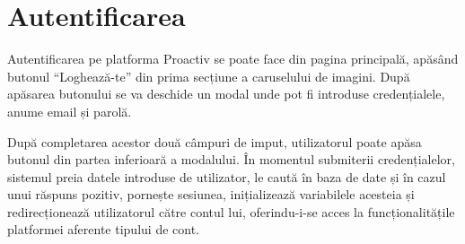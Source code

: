 \documentclass[12pt,a4paper]{report}
\begin{document}
\section{Autentificarea}
\par
Autentificarea pe platforma Proactiv se poate face din pagina principală, apăsând butonul  “Loghează-te” din prima secțiune a caruselului de imagini. După apăsarea butonului se va deschide un modal unde pot fi introduse credențialele, anume email și parolă.
\\
\par
După completarea acestor două câmpuri de imput, utilizatorul poate apăsa butonul din partea inferioară a modalului. În momentul submiterii credențialelor, sistemul preia datele introduse de utilizator, le caută în baza de date și în cazul unui răspuns pozitiv, pornește sesiunea, inițializează variabilele acesteia și redirecționează utilizatorul către contul lui, oferindu-i-se acces la funcționalitățile platformei aferente tipului de cont.
\\
\end{document}
